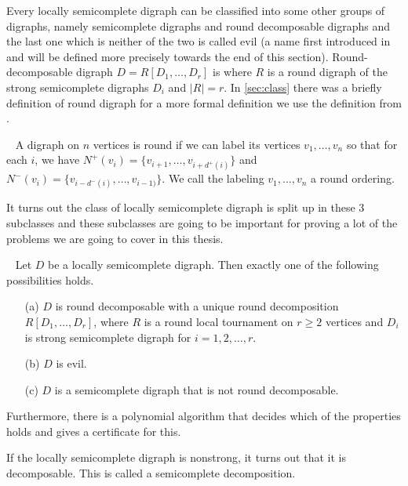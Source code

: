 
Every locally semicomplete digraph can be classified into some other groups of digraphs, namely semicomplete digraphs and round decomposable digraphs and the last one which is neither of the two is called evil (a name first introduced in \cite{bangJGT85} and will be defined more precisely towards the end of this section). 
Round-decomposable digraph $D=R[D_1,\dots,D_r]$ is where $R$ is a round digraph of the strong semicomplete digraphs $D_i$ and $|R|=r$.
In \autoref{sec:class} there was a briefly definition of round digraph for a more formal definition we use the definition from \cite{bangJGT77}.
\begin{definition}~\cite{bangJGT77}
    A digraph on $n$ vertices is round if we can label its vertices $v_1,\dots ,v_n$ so that for each $i$, we have $N^+(v_i)=\lbrace v_{i+1},\dots ,v_{i+d^+(i)}\rbrace$ and $N^-(v_i)=\lbrace v_{i-d^-(i)},\dots ,v_{i-1)}\rbrace$. We call the labeling $v_1,\dots ,v_n$ a round ordering. 
\end{definition}
It turns out the class of locally semicomplete digraph is split up in these 3 subclasses and these subclasses are going to be important for proving a lot of the problems we are going to cover in this thesis.
\begin{thm}~\cite{bangDM167,bangJGT85}
    Let $D$ be a locally semicomplete digraph. 
    Then exactly one of the following possibilities holds.
    \begin{itemize}
        \item[(a)] $D$ is round decomposable with a unique round decomposition $R[D_1,\dots ,D_r]$, where $R$ is a round local tournament on $r\geq 2$ vertices and $D_i$ is strong semicomplete digraph for $i=1,2,\dots,r$.
        \item[(b)] $D$ is evil.
        \item[(c)] $D$ is a semicomplete digraph that is not round decomposable. 
    \end{itemize}
    Furthermore, there is a polynomial algorithm that decides which of the properties holds and gives a certificate for this.
    \label{thm:treesubclasses}
\end{thm}
If the locally semicomplete digraph is nonstrong, it turns out that it is decomposable. 
This is called a semicomplete decomposition. 
